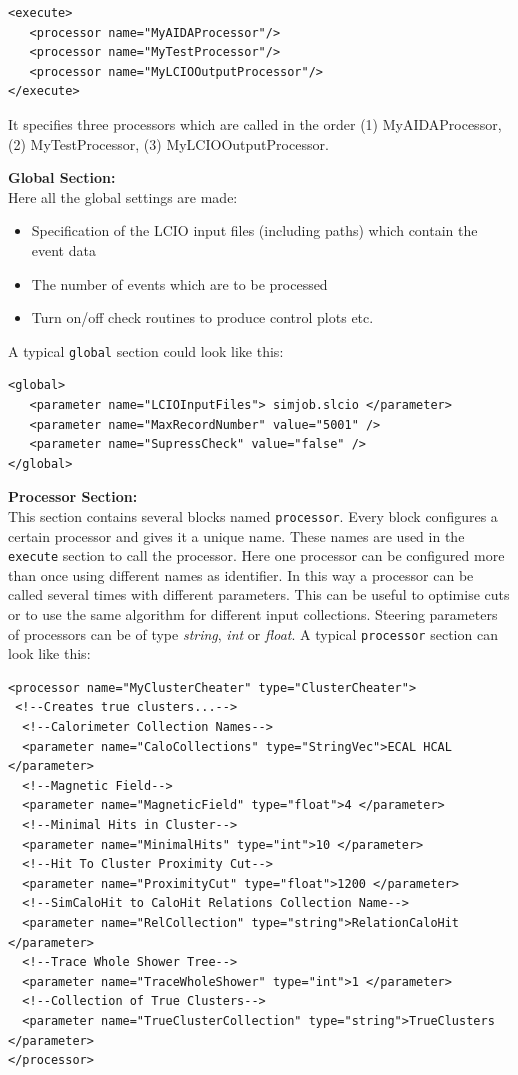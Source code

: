 \begin{verbatim}
<execute>
   <processor name="MyAIDAProcessor"/>
   <processor name="MyTestProcessor"/>
   <processor name="MyLCIOOutputProcessor"/>
</execute>
\end{verbatim}

It specifies three processors which are called in the order
(1) MyAIDAProcessor, (2) MyTestProcessor, (3) MyLCIOOutputProcessor.

{\bf Global Section:} \\
Here all the global settings are made: 
\begin{itemize}
\item Specification of the LCIO input files 
      (including paths) which contain the event data
\item The number of events which are to be processed
\item Turn on/off check routines to produce control plots etc. 
\end{itemize}
A typical {\tt global} section could look like this:

\begin{verbatim}
<global>
   <parameter name="LCIOInputFiles"> simjob.slcio </parameter>
   <parameter name="MaxRecordNumber" value="5001" />
   <parameter name="SupressCheck" value="false" />
</global>
\end{verbatim}

{\bf Processor Section:} \\
This section contains several blocks named {\tt processor}. Every block 
configures a certain processor and gives it a unique name. These 
names are used in the {\tt execute} section to call the processor. 
Here one processor can be configured more than once using different 
names as identifier. In this way a processor can be called several 
times with different parameters. This can be useful to 
optimise cuts or to use the same algorithm for different input collections. 
Steering parameters of processors can be of type {\em string},  
{\em int} or {\em float}. 
A typical {\tt processor} section can look like this:

\begin{verbatim} 
<processor name="MyClusterCheater" type="ClusterCheater">
 <!--Creates true clusters...-->
  <!--Calorimeter Collection Names-->
  <parameter name="CaloCollections" type="StringVec">ECAL HCAL  </parameter>
  <!--Magnetic Field-->
  <parameter name="MagneticField" type="float">4 </parameter>
  <!--Minimal Hits in Cluster-->
  <parameter name="MinimalHits" type="int">10 </parameter>
  <!--Hit To Cluster Proximity Cut-->
  <parameter name="ProximityCut" type="float">1200 </parameter>
  <!--SimCaloHit to CaloHit Relations Collection Name-->
  <parameter name="RelCollection" type="string">RelationCaloHit </parameter>
  <!--Trace Whole Shower Tree-->
  <parameter name="TraceWholeShower" type="int">1 </parameter>
  <!--Collection of True Clusters-->
  <parameter name="TrueClusterCollection" type="string">TrueClusters </parameter>
</processor>
\end{verbatim}

